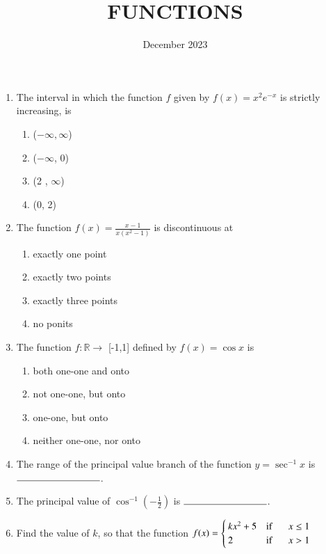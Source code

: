 \documentclass[12pt,-letter paper]{article}
\title{FUNCTIONS}
\date{December 2023}
\begin{document}
                     
\maketitle                           
\begin{enumerate}
\item The interval in which the function $f$ given by $f(x)=x^{2}e^{-x}$ is strictly\\ increasing, is         
\begin{enumerate}                    
\item($-\infty, \infty$)             
\item($-\infty$, 0)                  
\item(2 , $\infty$)                  
\item(0, 2)
\end{enumerate}                      
\item The function $f(x)=\frac{x-1} {x(x^2-1)}$ is discontinuous at       
\begin{enumerate}
\item exactly one point              
\item exactly two points             
\item exactly three points           
\item no ponits                      
\end{enumerate}                      
\item The function $f:\mathbb{R}\to$ [-1,1] defined by $f(x)=\cos{x}$ is
\begin{enumerate}                    
\item both one-one and onto
\item not one-one, but onto
\item one-one, but onto               
\item neither one-one, nor onto
\end{enumerate}
\item The range of the principal value branch of the function $y= \sec^{-1}x$ is $\rule{3cm}{0.15mm}$.         
\item The principal value of $\cos^{-1} \left(-\frac{1}{2}\right)$ is $\rule{3cm}{0.15mm}$.
\item Find the value of $k$, so that the function $f(x) =\begin{cases}kx^{2}+ 5 & \text{if } \hspace{0.5cm} x \leq1 \\ 2 & \text{if } \hspace{0.5cm} x > 1\end{cases}$

\end{enumerate}
\end{document}
